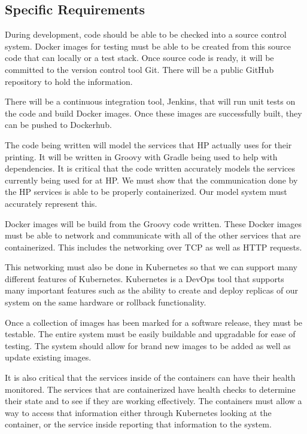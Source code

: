 \documentclass[onecolumn, draftclsnofoot,10pt, compsoc]{IEEEtran}
\begin{document}
\subsection{Specific Requirements}

During development, code should be able to be checked into a source control system. 
Docker images for testing must be able to be created from this source code that can locally or a test stack. 
Once source code is ready, it will be committed to the version control tool Git. 
There will be a public GitHub repository to hold the information. 

There will be a continuous integration tool, Jenkins, that will run unit tests on the code and build Docker images. 
Once these images are successfully built, they can be pushed to Dockerhub. 

The code being written will model the services that HP actually uses for their printing. 
It will be written in Groovy with Gradle being used to help with dependencies. It is critical that the code written accurately models the services currently being used for at HP. 
We must show that the communication done by the HP services is able to be properly containerized. 
Our model system must accurately represent this.

Docker images will be build from the Groovy code written. 
These Docker images must be able to network and communicate with all of the other services that are containerized. 
This includes the networking over TCP as well as HTTP requests.

This networking must also be done in Kubernetes so that we can support many different features of Kubernetes. 
Kubernetes is a DevOps tool that supports many important features such as the ability to create and deploy replicas of our system on the same hardware or rollback functionality.

Once a collection of images has been marked for a software release, they must be testable. 
The entire system must be easily buildable and upgradable for ease of testing. 
The system should allow for brand new images to be added as well as update existing images. 

It is also critical that the services inside of the containers can have their health monitored. 
The services that are containerized have health checks to determine their state and to see if they are working effectively. 
The containers must allow a way to access that information either through Kubernetes looking at the container, or the service inside reporting that information to the system. 
\end{document}
